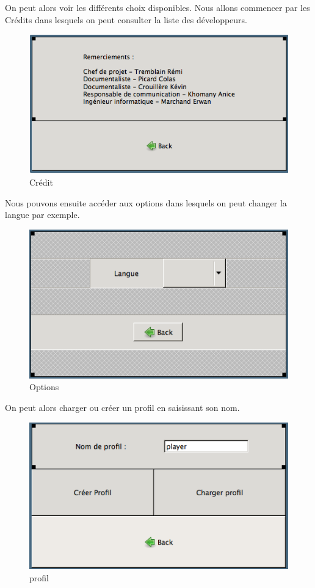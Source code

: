 \documentclass[11pt]{article}
\begin{document}
	On peut alors voir les différents choix disponibles.
	Nous allons commencer par les Crédits dans lesquels on peut consulter la liste des développeurs.
	
		\begin{figure}[!ht]
			\centering
			\includegraphics[]{./IHM/credits.png}
			\caption{Crédit}
		\end{figure}
		
	\FloatBarrier
		
	Nous pouvons ensuite accéder aux options dans lesquels on peut changer la langue par exemple.
	
		\begin{figure}[!ht]
			\centering
			\includegraphics[]{./IHM/options.png}
			\caption{Options}
		\end{figure}
		
	\FloatBarrier
	
	On peut alors charger ou créer un profil en saisissant son nom.
	
		\begin{figure}[!ht]
			\centering
			\includegraphics[]{./IHM/profil.png}
			\caption{profil}
		\end{figure}
	
\end{document}
